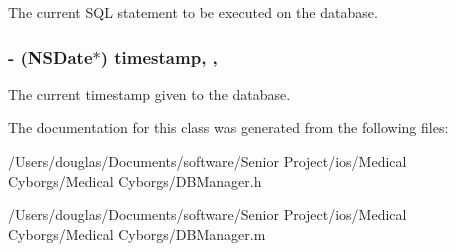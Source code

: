 The current S\-Q\-L statement to be executed on the database. \hypertarget{interface_d_b_manager_a62443c98d9fade6ab9906836bf146b72}{
\subsubsection[{timestamp}]{\setlength{\rightskip}{0pt plus 5cm}-\/ (N\-S\-Date$\ast$) timestamp\hspace{0.3cm}{\ttfamily [read]}, {\ttfamily [write]}, {\ttfamily [atomic]}}}\label{interface_d_b_manager_a62443c98d9fade6ab9906836bf146b72}
The current timestamp given to the database. 

The documentation for this class was generated from the following files\-:\begin{DoxyCompactItemize}
\item 
/\-Users/douglas/\-Documents/software/\-Senior Project/ios/\-Medical Cyborgs/\-Medical Cyborgs/D\-B\-Manager.\-h\item 
/\-Users/douglas/\-Documents/software/\-Senior Project/ios/\-Medical Cyborgs/\-Medical Cyborgs/D\-B\-Manager.\-m\end{DoxyCompactItemize}
